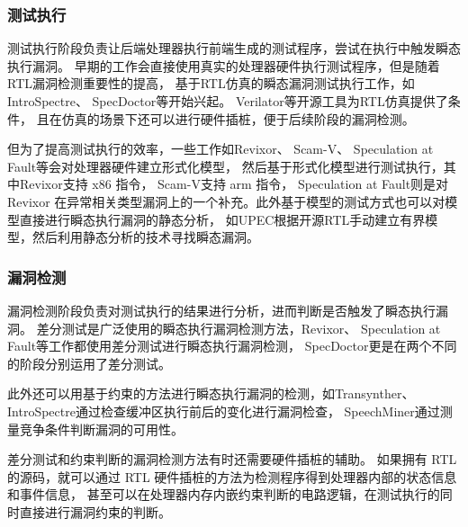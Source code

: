 \subsubsection{测试执行}

测试执行阶段负责让后端处理器执行前端生成的测试程序，尝试在执行中触发瞬态执行漏洞。
早期的工作会直接使用真实的处理器硬件执行测试程序，但是随着RTL漏洞检测重要性的提高，
基于RTL仿真的瞬态漏洞测试执行工作，如IntroSpectre\cite{ghaniyoun2021introspectre}、
SpecDoctor\cite{hur2022specdoctor}等开始兴起。
Verilator\cite{snyder2013verilator}等开源工具为RTL仿真提供了条件，
且在仿真的场景下还可以进行硬件插桩，便于后续阶段的漏洞检测。\par

但为了提高测试执行的效率，一些工作如Revixor\cite{oleksenko2022revizor}、
Scam-V\cite{nemati2020validation}、
Speculation at Fault\cite{hofmann2023speculation}等会对处理器硬件建立形式化模型，
然后基于形式化模型进行测试执行，其中Revixor\cite{oleksenko2022revizor}支持 x86 指令，
Scam-V\cite{hofmann2023speculation}支持 arm 指令，
Speculation at Fault\cite{hofmann2023speculation}则是对Revixor\cite{oleksenko2022revizor}
在异常相关类型漏洞上的一个补充。此外基于模型的测试方式也可以对模型直接进行瞬态执行漏洞的静态分析，
如UPEC\cite{fadiheh2020formal}根据开源RTL手动建立有界模型，然后利用静态分析的技术寻找瞬态漏洞。

\subsubsection{漏洞检测}

漏洞检测阶段负责对测试执行的结果进行分析，进而判断是否触发了瞬态执行漏洞。
差分测试是广泛使用的瞬态执行漏洞检测方法，Revixor\cite{oleksenko2022revizor}、
Speculation at Fault\cite{hofmann2023speculation}等工作都使用差分测试进行瞬态执行漏洞检测，
SpecDoctor\cite{hur2022specdoctor}更是在两个不同的阶段分别运用了差分测试。\par

此外还可以用基于约束的方法进行瞬态执行漏洞的检测，如Transynther\cite{moghimi2020medusa}、
IntroSpectre\cite{ghaniyoun2021introspectre}通过检查缓冲区执行前后的变化进行漏洞检查，
SpeechMiner\cite{xiao2019speechminer}通过测量竞争条件判断漏洞的可用性。\par

差分测试和约束判断的漏洞检测方法有时还需要硬件插桩的辅助。
如果拥有 RTL 的源码，就可以通过 RTL 硬件插桩的方法为检测程序得到处理器内部的状态信息和事件信息，
甚至可以在处理器内存内嵌约束判断的电路逻辑，在测试执行的同时直接进行漏洞约束的判断。

